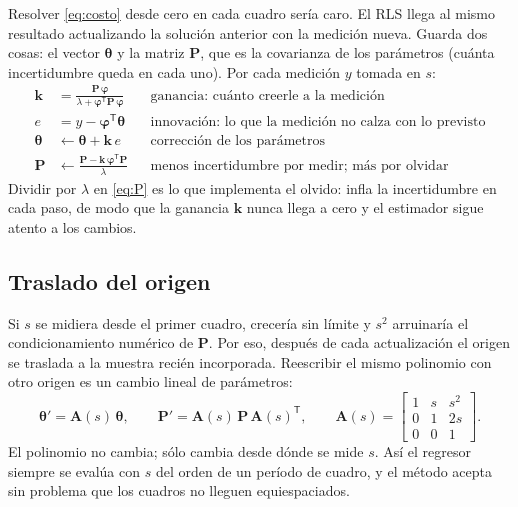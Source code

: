 \documentclass[11pt,a4paper]{article}
\newcommand{\lam}{\lambda}
\begin{document}
Resolver \eqref{eq:costo} desde cero en cada cuadro sería caro. El RLS llega al mismo resultado actualizando
la solución anterior con la medición nueva. Guarda dos cosas: el vector $\boldsymbol{\theta}$ y la matriz
$\mathbf P$, que es la covarianza de los parámetros (cuánta incertidumbre queda en cada uno). Por cada
medición $y$ tomada en $s$:
\begin{align}
  \mathbf k &= \frac{\mathbf P\,\boldsymbol{\varphi}}{\lam + \boldsymbol{\varphi}^{\mathsf T}\mathbf P\,\boldsymbol{\varphi}} && \text{ganancia: cuánto creerle a la medición} \label{eq:k}\\
  e &= y - \boldsymbol{\varphi}^{\mathsf T}\boldsymbol{\theta} && \text{innovación: lo que la medición no calza con lo previsto} \label{eq:e}\\
  \boldsymbol{\theta} &\leftarrow \boldsymbol{\theta} + \mathbf k\, e && \text{corrección de los parámetros} \label{eq:th}\\
  \mathbf P &\leftarrow \frac{\mathbf P - \mathbf k\,\boldsymbol{\varphi}^{\mathsf T}\mathbf P}{\lam} && \text{menos incertidumbre por medir; más por olvidar} \label{eq:P}
\end{align}
Dividir por $\lam$ en \eqref{eq:P} es lo que implementa el olvido: infla la incertidumbre en cada paso, de modo
que la ganancia $\mathbf k$ nunca llega a cero y el estimador sigue atento a los cambios.

\subsection{Traslado del origen}

Si $s$ se midiera desde el primer cuadro, crecería sin límite y $s^2$ arruinaría el condicionamiento numérico
de $\mathbf P$. Por eso, después de cada actualización el origen se traslada a la muestra recién incorporada.
Reescribir el mismo polinomio con otro origen es un cambio lineal de parámetros:
\begin{equation}
  \boldsymbol{\theta}' = \mathbf A(s)\,\boldsymbol{\theta}, \qquad \mathbf P' = \mathbf A(s)\,\mathbf P\,\mathbf A(s)^{\mathsf T},
  \qquad
  \mathbf A(s) = \begin{bmatrix} 1 & s & s^2 \\ 0 & 1 & 2s \\ 0 & 0 & 1 \end{bmatrix}.
  \label{eq:A}
\end{equation}
El polinomio no cambia; sólo cambia desde dónde se mide $s$. Así el regresor siempre se evalúa con $s$ del
orden de un período de cuadro, y el método acepta sin problema que los cuadros no lleguen equiespaciados.
\end{document}
